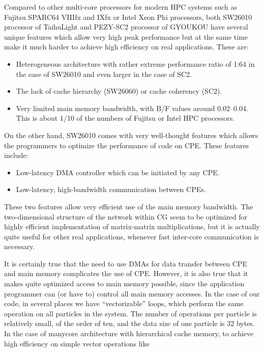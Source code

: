 \documentclass[conference]{IEEEtran}
\begin{document}
Compared to other multi-core processors for modern  HPC systems such
as Fujitsu SPARC64 VIIIfx and IXfx or Intel Xeon Phi processors,
both SW26010 processor  of TaihuLight and PEZY-SC2 processor of
GYOUKOU have several unique features which allow very high peak
performance but at the same time make it much harder to achieve high
efficiency on real applications. These are:

\begin{itemize}

  \item Heterogeneous architecture with rather extreme performance
    ratio of 1:64 in the case of SW26010 and even larger in the case
    of SC2.
  \item The lack of cache hierarchy (SW26060) or cache coherency (SC2).
  \item Very limited main memory bandwidth, with B/F values around
    0.02--0.04.  This is about 1/10 of the numbers of Fujitsu or Intel HPC processors.
    
\end{itemize}  

On the other hand, SW26010 comes with very well-thought features which
allows the programmers to optimize the performance of code on
CPE. These features include:
\begin{itemize}

\item Low-latency DMA controller which can be initiated by any CPE.
\item Low-latency, high-bandwidth communication between CPEs.
  
\end{itemize}  

These two features allow very efficient use of the main memory
bandwidth. The two-dimensional structure of the network within CG seem
to be optimized for highly efficient implementation of matrix-matrix
multiplications, but it is actually quite useful for other real
applications, whenever fast inter-core communication is necessary.

It is certainly true that the need to use DMAs for data transfer
between CPE and main memory complicates the use of CPE. However, it is
also true that it makes quite optimized access to main memory
possible, since the application programmer can (or have to) control
all main memory accesses. In the case of our code, in several places
we have ``vectorizable'' loops, which perform the same operation on all
particles in the system. The number of operations per particle is
relatively small, of the order of ten, and the data size of one
particle is 32 bytes. In the case of manycore architecture with
hierarchical cache memory, to achieve high efficiency on simple vector
operations like 
\end{document}
